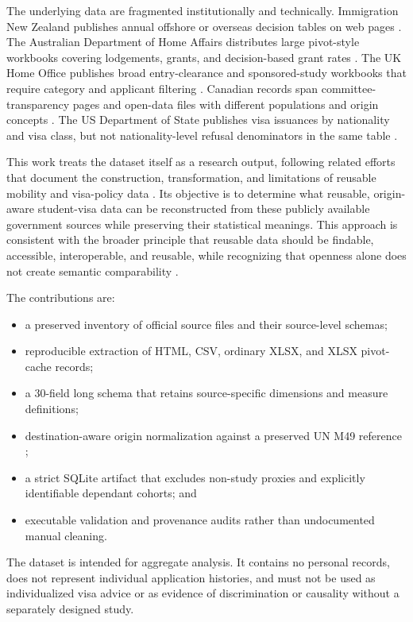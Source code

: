 \documentclass[runningheads]{llncs}
\begin{document}
The underlying data are fragmented institutionally and technically. Immigration New Zealand publishes annual offshore or overseas decision tables on web pages \cite{inz}. The Australian Department of Home Affairs distributes large pivot-style workbooks covering lodgements, grants, and decision-based grant rates \cite{australia}. The UK Home Office publishes broad entry-clearance and sponsored-study workbooks that require category and applicant filtering \cite{uk}. Canadian records span committee-transparency pages and open-data files with different populations and origin concepts \cite{canada}. The US Department of State publishes visa issuances by nationality and visa class, but not nationality-level refusal denominators in the same table \cite{us}.

This work treats the dataset itself as a research output, following related efforts that document the construction, transformation, and limitations of reusable mobility and visa-policy data \cite{recchi2021,weber2023}. Its objective is to determine what reusable, origin-aware student-visa data can be reconstructed from these publicly available government sources while preserving their statistical meanings. This approach is consistent with the broader principle that reusable data should be findable, accessible, interoperable, and reusable, while recognizing that openness alone does not create semantic comparability \cite{fair}.

The contributions are:

\begin{itemize}
  \item a preserved inventory of official source files and their source-level schemas;
  \item reproducible extraction of HTML, CSV, ordinary XLSX, and XLSX pivot-cache records;
  \item a 30-field long schema that retains source-specific dimensions and measure definitions;
  \item destination-aware origin normalization against a preserved UN M49 reference \cite{unsd};
  \item a strict SQLite artifact that excludes non-study proxies and explicitly identifiable dependant cohorts; and
  \item executable validation and provenance audits rather than undocumented manual cleaning.
\end{itemize}

The dataset is intended for aggregate analysis. It contains no personal records, does not represent individual application histories, and must not be used as individualized visa advice or as evidence of discrimination or causality without a separately designed study.
\end{document}
